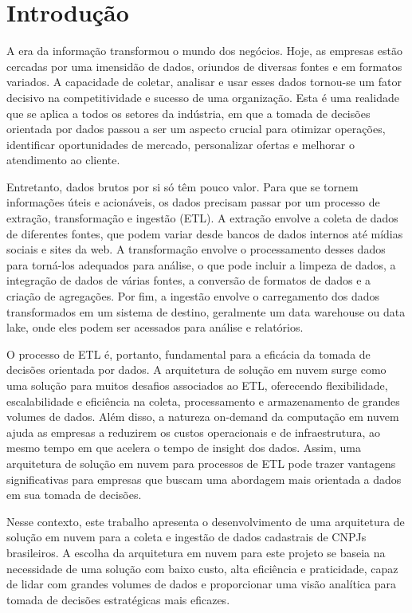 \chapter{Introdução}

A era da informação transformou o mundo dos negócios. Hoje, as empresas estão cercadas por uma imensidão de dados, oriundos de diversas fontes e em formatos variados. A capacidade de coletar, analisar e usar esses dados tornou-se um fator decisivo na competitividade e sucesso de uma organização. Esta é uma realidade que se aplica a todos os setores da indústria, em que a tomada de decisões orientada por dados passou a ser um aspecto crucial para otimizar operações, identificar oportunidades de mercado, personalizar ofertas e melhorar o atendimento ao cliente.

Entretanto, dados brutos por si só têm pouco valor. Para que se tornem informações úteis e acionáveis, os dados precisam passar por um processo de extração, transformação e ingestão (ETL). A extração envolve a coleta de dados de diferentes fontes, que podem variar desde bancos de dados internos até mídias sociais e sites da web. A transformação envolve o processamento desses dados para torná-los adequados para análise, o que pode incluir a limpeza de dados, a integração de dados de várias fontes, a conversão de formatos de dados e a criação de agregações. Por fim, a ingestão envolve o carregamento dos dados transformados em um sistema de destino, geralmente um data warehouse ou data lake, onde eles podem ser acessados para análise e relatórios.

O processo de ETL é, portanto, fundamental para a eficácia da tomada de decisões orientada por dados. A arquitetura de solução em nuvem surge como uma solução para muitos desafios associados ao ETL, oferecendo flexibilidade, escalabilidade e eficiência na coleta, processamento e armazenamento de grandes volumes de dados. Além disso, a natureza on-demand da computação em nuvem ajuda as empresas a reduzirem os custos operacionais e de infraestrutura, ao mesmo tempo em que acelera o tempo de insight dos dados. Assim, uma arquitetura de solução em nuvem para processos de ETL pode trazer vantagens significativas para empresas que buscam uma abordagem mais orientada a dados em sua tomada de decisões.


Nesse contexto, este trabalho apresenta o desenvolvimento de uma arquitetura de solução em nuvem para a coleta e ingestão de dados cadastrais de CNPJs brasileiros. A escolha da arquitetura em nuvem para este projeto se baseia na necessidade de uma solução com baixo custo, alta eficiência e praticidade, capaz de lidar com grandes volumes de dados e proporcionar uma visão analítica para tomada de decisões estratégicas mais eficazes.
